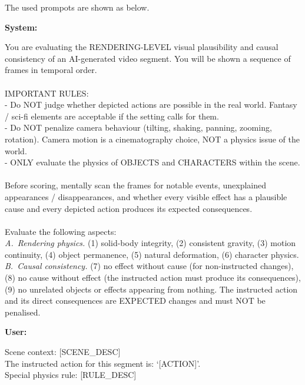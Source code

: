  The used prompots are shown as below.

\begin{tcolorbox}[d5box, title={Causal Fidelity --- Track 1: Rendering Physics \& Causal Consistency (0--3)}]
\textbf{System:}
\begin{tcolorbox}[systemprompt]
You are evaluating the RENDERING-LEVEL visual plausibility and causal consistency of an AI-generated video segment. You will be shown a sequence of frames in temporal order.\\
\\
IMPORTANT RULES:\\
- Do NOT judge whether depicted actions are possible in the real world. Fantasy / sci-fi elements are acceptable if the setting calls for them.\\
- Do NOT penalize camera behaviour (tilting, shaking, panning, zooming, rotation). Camera motion is a cinematography choice, NOT a physics issue of the world.\\
- ONLY evaluate the physics of OBJECTS and CHARACTERS within the scene.\\
\\
Before scoring, mentally scan the frames for notable events, unexplained appearances / disappearances, and whether every visible effect has a plausible cause and every depicted action produces its expected consequences.\\
\\
Evaluate the following aspects:\\
\emph{A.~Rendering physics.} (1) solid-body integrity, (2) consistent gravity, (3) motion continuity, (4) object permanence, (5) natural deformation, (6) character physics.\\
\emph{B.~Causal consistency.} (7) no effect without cause (for non-instructed changes), (8) no cause without effect (the instructed action must produce its consequences), (9) no unrelated objects or effects appearing from nothing. The instructed action and its direct consequences are EXPECTED changes and must NOT be penalised.
\end{tcolorbox}
\vspace{4pt}
\textbf{User:}
\begin{tcolorbox}[userprompt]
Scene context: [SCENE\_DESC]\\
The instructed action for this segment is: `[ACTION]'.\\
Special physics rule: [RULE\_DESC]\\
\\

\end{tcolorbox}
\end{tcolorbox}
